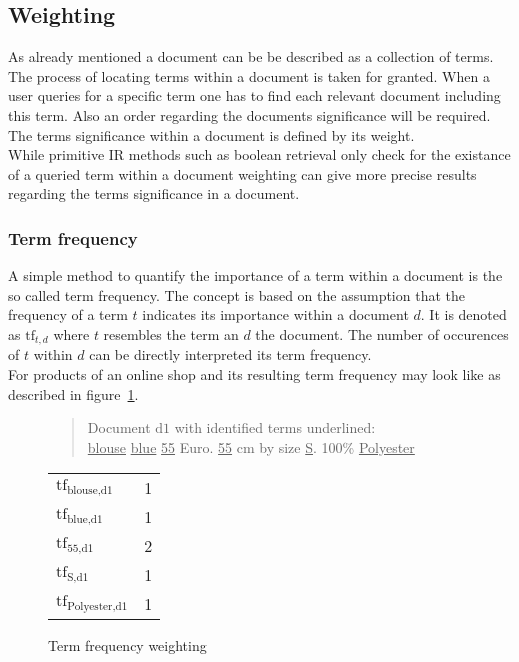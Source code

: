 \subsection{Weighting}
As already mentioned a document can be be described as a collection of terms.
The process of locating terms within a document is taken for granted.
When a user queries for a specific term one has to find each relevant document including this term.
Also an order regarding the documents significance will be required.
The terms significance within a document is defined by its weight.\citep[p.~117]{manning:2009}\\
While primitive IR methods such as boolean retrieval only check for the existance of a queried term within a document weighting can give more precise results regarding the terms significance in a document.\citep[p.~109]{manning:2009}

\subsubsection{Term frequency}
A simple method to quantify the importance of a term within a document is the so called term frequency.
The concept is based on the assumption that the frequency of a term $t$ indicates its importance within a document $d$.
It is denoted as $\text{tf}_{t,d}$ where $t$ resembles the term an $d$ the document.
The number of occurences of $t$ within $d$ can be directly interpreted its term frequency.\citep[p.~117]{manning:2009}\\
For products of an online shop and its resulting term frequency may look like as described in figure~\ref{fig:tfweighting}.\\
\begin{figure}[h]

    \begin{quote}
        Document $\text{d}1$ with identified terms underlined:\\
        \underline{blouse} \underline{blue} \underline{55} Euro. \underline{55} cm by size \underline{S}. 100\% \underline{Polyester}
    \end{quote}

    \center
    \vspace{5mm}
    \begin{tabular}{ l l }
        \rowcolor{\dustRowColourHead}
        \multicolumn{2}{c}{Term frequency}\\\hline
        $\text{tf}_{\text{blouse},\text{d1}}$       & 1\\
        $\text{tf}_{\text{blue},\text{d1}}$         & 1\\
        $\text{tf}_{\text{55},\text{d1}}$           & 2\\
        $\text{tf}_{\text{S},\text{d1}}$            & 1\\
        $\text{tf}_{\text{Polyester},\text{d1}}$    & 1\\
    \end{tabular}

    \caption{Term frequency weighting}
    \label{fig:tfweighting}
\end{figure}

